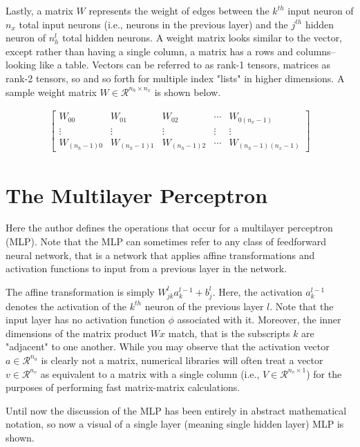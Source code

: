 \documentclass{article}
\begin{document}
Lastly, a matrix $W$ represents the weight of edges between the $k^{th}$
input neuron of $n_x$ total input neurons (i.e., neurons in the previous layer)
and the $j^{th}$ hidden neuron of $n_h^{l}$ total hidden neurons.
A weight matrix looks similar to the vector, except rather than having a single
column, a matrix has a rows and columns--looking like a table. Vectors can
be referred to as rank-1 tensors, matrices as rank-2 tensors, so and so forth
for multiple index "lists" in higher dimensions. A sample weight matrix
$W \in \mathcal{R}^{n_h \times n_x}$ is
shown below.

\begin{align}
	\begin{bmatrix}
		W_{00}         & W_{01}         & W_{02}         & \cdots & W_{0(n_{x}-1)}         \\
		\vdots         & \vdots         & \vdots         & \vdots & \vdots                 \\
		W_{(n_{h}-1)0} & W_{(n_{h}-1)1} & W_{(n_{h}-1)2} & \cdots & W_{(n_{h}-1)(n_{x}-1)}
	\end{bmatrix}
\end{align}

\section{The Multilayer Perceptron}
\quad Here the author defines the operations that occur for a multilayer perceptron (MLP).
Note that the MLP can sometimes refer to any class of feedforward
neural network, that is a network that applies affine transformations and
activation functions to input from a previous layer in the network.

The affine transformation is simply $W_{jk}^{l} a_{k}^{l-1} + b_{j}^{l}$. Here,
the activation $a_k^{l-1}$ denotes the activation of the $k^{th}$ neuron of the
previous layer $l$. Note that the input layer has no activation function $\phi$
associated with it. Moreover, the inner dimensions of the matrix product
$Wx$ match, that is the subscripts $k$ are "adjacent" to one another. While you may
observe that the activation vector $a \in \mathcal{R}^{n_a}$ is clearly not a matrix,
numerical libraries will often treat a vector $v \in \mathcal{R}^{n_v}$ as equivalent
to a matrix with a single column (i.e., $V \in \mathcal{R}^{n_v \times 1}$) for
the purposes of performing fast matrix-matrix calculations.

Until now the discussion of the MLP has been entirely in abstract mathematical
notation, so now a visual of a single layer (meaning single hidden layer)
MLP is shown.
\end{document}
